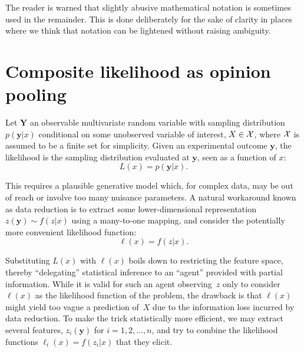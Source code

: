 \documentclass[english]{scrartcl}
\def\y{{\mathbf{y}}}
\begin{document}

The reader is warned that slightly abusive mathematical notation is sometimes used in the remainder. This is done deliberately for the sake of clarity in places where we think that notation can be lightened without raising ambiguity. 


\section{Composite likelihood as opinion pooling}
\label{sec:log_pool}

Let $\mathbf{Y}$ an observable multivariate random variable with sampling distribution $p(\y|x)$ conditional on some unobserved variable of interest, $X\in{\cal X}$, where ${\cal X}$ is assumed to be a finite set for simplicity. Given an experimental outcome $\y$, the likelihood is the sampling distribution evaluated at $\y$, seen as a function of $x$:
$$
L(x) = p(\y|x)
.
$$

This requires a plausible generative model which, for complex data, may be out of reach or involve too many nuisance parameters. A natural workaround known as data reduction is to extract some lower-dimensional representation $z(\y)\sim f(z|x)$ using a many-to-one mapping, and consider the potentially more convenient likelihood function:
$$
\ell(x) = f(z|x)
.
$$

Substituting $L(x)$ with $\ell(x)$ boils down to restricting the feature space, thereby  ``delegating'' statistical inference to an ``agent'' provided with partial information. While it is valid for such an agent observing~$z$ only to consider $\ell(x)$ as the likelihood function of the problem, the drawback is that $\ell(x)$ might yield too vague a prediction of~$X$ due to the information loss incurred by data reduction. To make the trick statistically more efficient, we may extract several features, $z_i(\y)$ for $i=1,2,\ldots,n$, and try to combine the likelihood functions $\ell_i(x) = f(z_i|x)$ that they elicit.
\end{document}
